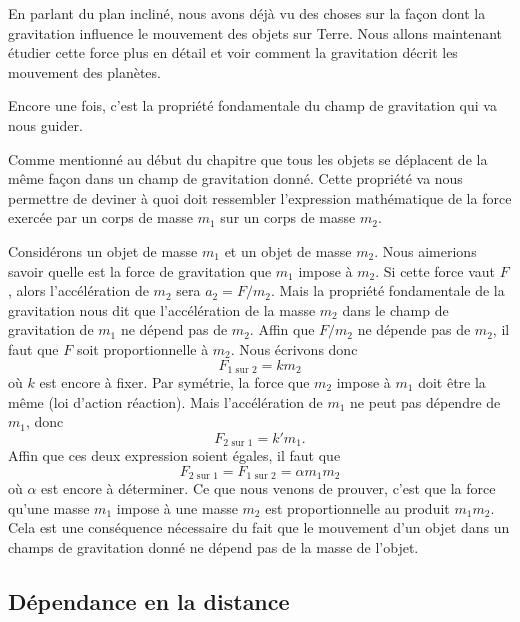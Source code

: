 En parlant du plan incliné, nous avons déjà vu des choses sur la façon dont la gravitation influence le mouvement des objets sur Terre. Nous allons maintenant étudier cette force plus en détail et voir comment la gravitation décrit les mouvement des planètes.

Encore une fois, c'est la propriété fondamentale du champ de gravitation qui va nous guider.

\begin{idee}
	Comme mentionné au début du chapitre que tous les objets se déplacent de la même façon dans un champ de gravitation donné. Cette propriété va nous permettre de deviner à quoi doit ressembler l'expression mathématique de la force exercée par un corps de masse $m_1$ sur un corps de masse $m_2$.
\end{idee}

Considérons un objet de masse $m_1$ et un objet de masse $m_2$. Nous aimerions savoir quelle est la force de gravitation que $m_1$ impose à $m_2$. Si cette force vaut $F$, alors l'accélération de $m_2$ sera $a_2=F/m_2$. Mais la propriété fondamentale de la gravitation nous dit que l'accélération de la masse $m_2$ dans le champ de gravitation de $m_1$ ne dépend pas de $m_2$. Affin que $F/m_2$ ne dépende pas de $m_2$, il faut que $F$ soit proportionnelle à $m_2$. Nous écrivons donc
\begin{equation}
	F_{\text{1 sur 2}}=k m_2
\end{equation}
où $k$ est encore à fixer. Par symétrie, la force que $m_2$ impose à $m_1$ doit être la même (loi d'action réaction). Mais l'accélération de $m_1$ ne peut pas dépendre de $m_1$, donc
\begin{equation}
	F_{\text{2 sur 1}}=k' m_1.
\end{equation}
Affin que ces deux expression soient égales, il faut que
\begin{equation}
	F_{\text{2 sur 1}}=F_{\text{1 sur 2}}=\alpha m_1 m_2
\end{equation}
où $\alpha$ est encore à déterminer. Ce que nous venons de prouver, c'est que la force qu'une masse $m_1$ impose à une masse $m_2$ est proportionnelle au produit $m_1m_2$. Cela est une conséquence nécessaire du fait que le mouvement d'un objet dans un champs de gravitation donné ne dépend pas de la masse de l'objet.

\subsection{Dépendance en la distance}



